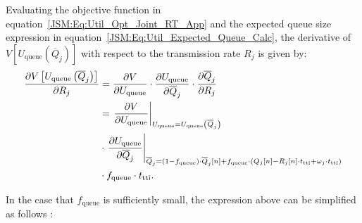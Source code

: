 \begin{apendicesenv}
Evaluating the objective function in equation~\eqref{JSM:Eq:Util_Opt_Joint_RT_App} and the expected queue size expression in equation~\eqref{JSM:Eq:Util_Expected_Queue_Calc}, the derivative of $V\left[U_{\mathrm{queue}}\left(\overline{Q}_{j}\right)\right]$ with respect to the transmission rate $R_j$ is given by:
%
\begin{align}
\label{JSM:Eq:Utility_Derivative_RT}
\frac{\partial V\left[U_{\mathrm{queue}}\left(\overline{Q}_{j}\right)\right]}{\partial R_j}& =  \frac{\partial V}{\partial U_{\mathrm{queue}}} \cdot \frac{\partial U_{\mathrm{queue}}}{\partial \overline{Q}_{j}} \cdot \frac{\partial \overline{Q}_{j}}{\partial R_j} \notag \\ & = \left.\dfrac{\partial V}{\partial U_{\mathrm{queue}}}\right\vert_{U_{\mathrm{queue}} = U_{\mathrm{queue}}\left(\overline{Q}_{j}\right)} \notag \\ & \cdot \left.\dfrac{\partial U_{\mathrm{queue}}}{\partial \overline{Q}_{j}}\right\vert_{\overline{Q}_{j} = \left(1 - f_{\mathrm{queue}}\right) \cdot \overline{Q}_{j}\left[n\right] + f_{\mathrm{queue}} \cdot \left( Q_{j}\left[n\right] - R_j\left[n\right] \cdot t_{\mathrm{tti}} + \omega_j \cdot t_{\mathrm{tti}} \right)}
\notag \\ & \cdot f_{\mathrm{queue}} \cdot t_{\mathrm{tti}}.
\end{align}

In the case that $f_{\mathrm{queue}}$ is sufficiently small, the expression above can be simplified as follows \cite{Art:Song2005_p2}:


\end{apendicesenv}
